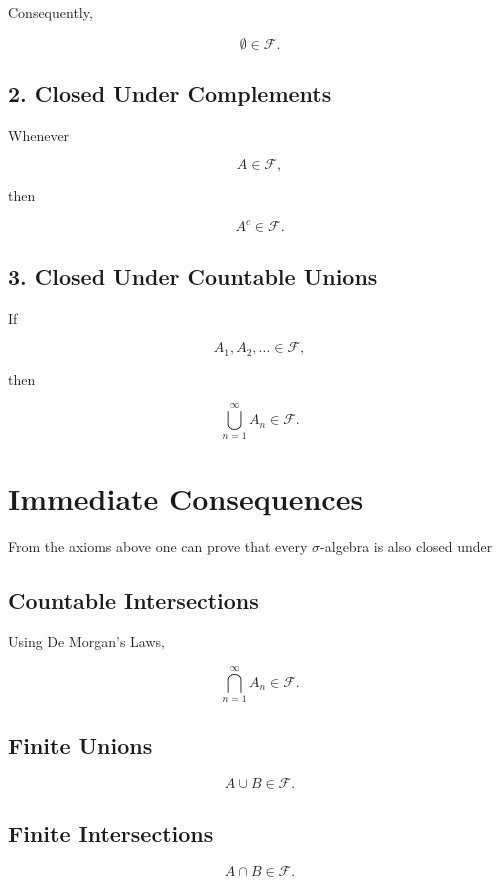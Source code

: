 \documentclass[11pt]{article}
\begin{document}
	Consequently,
	
	\[
	\emptyset\in\mathcal F.
	\]
	
	\subsection*{2. Closed Under Complements}
	
	Whenever
	
	\[
	A\in\mathcal F,
	\]
	
	then
	
	\[
	\boxed{
		A^c\in\mathcal F.
	}
	\]
	
	\subsection*{3. Closed Under Countable Unions}
	
	If
	
	\[
	A_1,A_2,\ldots\in\mathcal F,
	\]
	
	then
	
	\[
	\boxed{
		\bigcup_{n=1}^{\infty}A_n
		\in
		\mathcal F.
	}
	\]
	
	
	\section{Immediate Consequences}
	
	From the axioms above one can prove that every $\sigma$-algebra is also
	closed under
	
	\subsection*{Countable Intersections}
	
	Using De Morgan's Laws,
	
	\[
	\boxed{
		\bigcap_{n=1}^{\infty}A_n
		\in
		\mathcal F.
	}
	\]
	
	\subsection*{Finite Unions}
	
	\[
	A\cup B\in\mathcal F.
	\]
	
	\subsection*{Finite Intersections}
	
	\[
	A\cap B\in\mathcal F.
	\]
	
\end{document}
